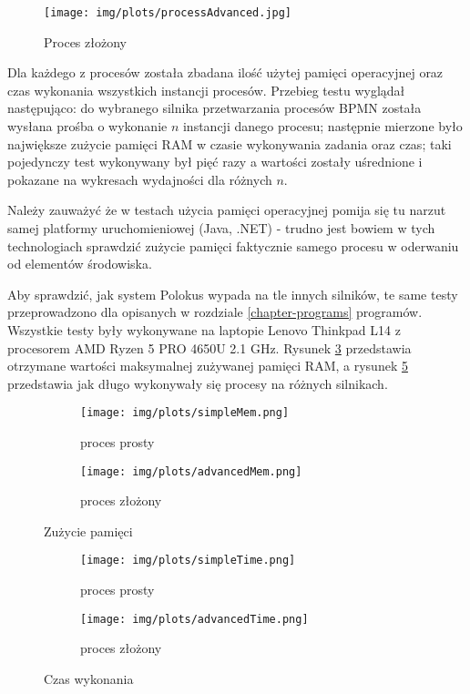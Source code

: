 \documentclass[declaration,shortabstract,mgr]{iithesis}
\newcommand{\bpmn}{BPMN }
\begin{document}
\begin{figure}[h]
     \centering
     \texttt{[image: img/plots/processAdvanced.jpg]}
     \caption{Proces złożony}
     \label{process-advanced}
\end{figure}

Dla każdego z procesów została zbadana ilość użytej pamięci operacyjnej oraz czas wykonania wszystkich instancji procesów. Przebieg testu wyglądał następująco: do wybranego silnika przetwarzania procesów \bpmn została wysłana prośba o wykonanie $n$ instancji danego procesu; następnie mierzone było największe zużycie pamięci RAM w czasie wykonywania zadania oraz czas; taki pojedynczy test wykonywany był pięć razy a wartości zostały uśrednione i pokazane na wykresach wydajności dla różnych $n$.

Należy zauważyć że w testach użycia pamięci operacyjnej pomija się tu narzut samej platformy uruchomieniowej (Java, .NET) - trudno jest bowiem w tych technologiach sprawdzić zużycie pamięci faktycznie samego procesu w oderwaniu od elementów środowiska. 

Aby sprawdzić, jak system Polokus wypada na tle innych silników, te same testy przeprowadzono dla opisanych w rozdziale \ref{chapter-programs} programów. Wszystkie testy były wykonywane na laptopie Lenovo Thinkpad L14 z procesorem AMD Ryzen 5 PRO 4650U 2.1 GHz. Rysunek \ref{fig:mem} przedstawia otrzymane wartości maksymalnej zużywanej pamięci RAM, a rysunek \ref{fig:time} przedstawia jak długo wykonywały się procesy na różnych silnikach.

\begin{figure}[H]
     \centering
     \begin{subfigure}[b]{0.49\textwidth}
         \centering
         \texttt{[image: img/plots/simpleMem.png]}
         \caption{proces prosty}
     \end{subfigure}
     \hfill
     \begin{subfigure}[b]{0.49\textwidth}
         \centering
         \texttt{[image: img/plots/advancedMem.png]}
         \caption{proces złożony}
         \label{fig:mem-adv}
     \end{subfigure}
        \caption{Zużycie pamięci}
        \label{fig:mem}
\end{figure}

\begin{figure}[H]
     \centering
     \begin{subfigure}[b]{0.49\textwidth}
         \centering
         \texttt{[image: img/plots/simpleTime.png]}
         \caption{proces prosty}
     \end{subfigure}
     \hfill
     \begin{subfigure}[b]{0.49\textwidth}
         \centering
         \texttt{[image: img/plots/advancedTime.png]}
         \caption{proces złożony}
         \label{fig:time-adv}
     \end{subfigure}
        \caption{Czas wykonania}
        \label{fig:time}
\end{figure}
\end{document}
